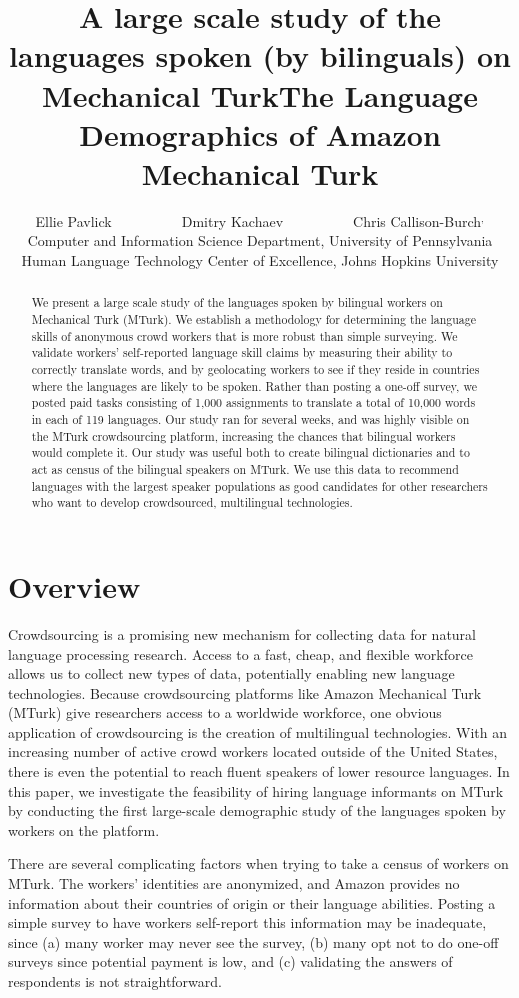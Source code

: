 \documentclass[11pt]{article}
\title{A large scale study of the languages spoken (by bilinguals) on Mechanical Turk}
\title{The Language Demographics of  Amazon Mechanical Turk}
\author{Ellie Pavlick\affliationPenn \ \ \ \ \ \ \ \ \ \ Dmitry Kachaev\affliationJHU \ \ \ \ \ \ \ \ \ \  Chris Callison-Burch\affliationPenn$^{,}$\affliationJHU \\
\affliationPenn Computer and Information Science Department, University of Pennsylvania \\
\affliationJHU Human Language Technology Center of Excellence, Johns Hopkins University \\
  }
\author{}
\date{}
\begin{document}
\maketitle

\begin{abstract}
We present a large scale study of the languages spoken by bilingual workers on Mechanical Turk (MTurk).  
We establish a  methodology for determining the language skills of anonymous crowd workers that is more robust than simple surveying.  We validate workers' self-reported language skill claims by measuring their ability to correctly translate words, and by geolocating workers to see if they reside in countries where the languages are likely to be spoken. Rather than posting a one-off survey, we posted paid tasks consisting of 1,000 assignments to translate a total of 10,000 words in each of 119 languages.  Our study ran for several weeks, and was highly visible on the MTurk crowdsourcing platform, increasing the chances that bilingual workers would complete it.  Our study was useful both to create bilingual dictionaries and to act as census of the bilingual speakers on MTurk.  We use this data to recommend languages with the largest speaker populations as good candidates for other researchers who want to  develop crowdsourced, multilingual technologies.

\end{abstract}

\section{Overview}
Crowdsourcing is a promising new mechanism for collecting data for natural language processing research. Access to a fast, cheap, and flexible workforce allows us to collect new types of data, potentially enabling new language technologies.
Because crowdsourcing platforms like Amazon Mechanical Turk (MTurk) give researchers access to a worldwide workforce, one obvious application of crowdsourcing is the creation of multilingual technologies. 
With an increasing number of active crowd workers located outside of the United States, there is even the potential to reach fluent speakers of lower resource languages.
In this paper, we investigate the feasibility of hiring language informants on MTurk by conducting the first large-scale demographic study of the languages spoken by workers on the platform. 

There are several complicating factors when trying to take a census of workers on MTurk.  The workers' identities are anonymized, and Amazon provides no information about their countries of origin or their language abilities.  Posting a simple survey to have workers self-report this information may be inadequate, since (a) many worker may never see the survey, (b) many opt not to do one-off surveys since potential payment is low, and (c) validating the answers of respondents is not straightforward. 
\end{document}

